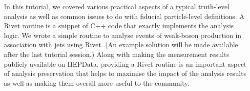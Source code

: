 \documentclass[10pt,fleqn]{scrartcl}
\theoremstyle{exstyle}
\begin{document}
In this tutorial, we covered various practical aspects of a typical truth-level analysis
as well as common issues to do with fiducial particle-level definitions.
A Rivet routine is a snippet of C++ code that exactly implements the analysis logic.
We wrote a simple routine to analyse events of weak-boson production in association
with jets using Rivet. 
(An example solution will be made available after the last tutorial session.)
Along with making the measurement results publicly available on HEPData,
providing a Rivet routine is an important aspect of analysis preservation
that helps to maximise the impact of the analysis results as well as
making them overall more useful to the community.
\end{document}
